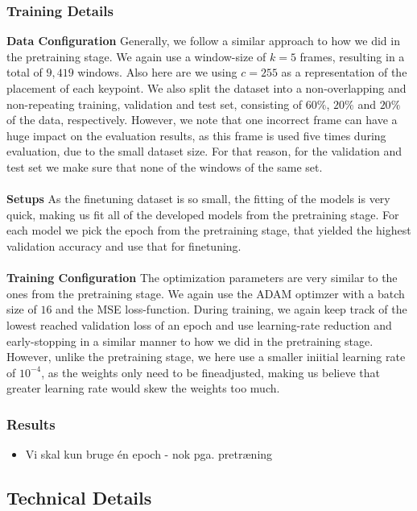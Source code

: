 \documentclass[./main.tex]{subfiles}
\begin{document}
\subsubsection{Training Details}
\textbf{Data Configuration} Generally, we follow a similar approach to how we did in the pretraining stage. We again use a window-size of $k = 5$ frames, resulting in a total of $9,419$ windows. Also here are we using $c = 255$ as a representation of the placement of each keypoint. We also split the dataset into a non-overlapping and non-repeating training, validation and test set, consisting of $60\%$, $20\%$ and $20\%$ of the data, respectively. However, we note that one incorrect frame can have a huge impact on the evaluation results, as this frame is used five times during evaluation, due to the small dataset size. For that reason, for the validation and test set we make sure that none of the windows of the same set.
\\
\\
\textbf{Setups} As the finetuning dataset is so small, the fitting of the models is very quick, making us fit all of the developed models from the pretraining stage. For each model we pick the epoch from the pretraining stage, that yielded the highest validation accuracy and use that for finetuning.
\\
\\
\textbf{Training Configuration} The optimization parameters are very similar to the ones from the pretraining stage. We again use the ADAM optimzer with a batch size of $16$ and the MSE loss-function. During training, we again keep track of the lowest reached validation loss of an epoch and use learning-rate reduction and early-stopping in a similar manner to how we did in the pretraining stage. However, unlike the pretraining stage, we here use a smaller iniitial learning rate of $10^{-4}$, as the weights only need to be fineadjusted, making us believe that greater learning rate would skew the weights too much.

\subsubsection{Results}
\begin{itemize}
    \item Vi skal kun bruge én epoch - nok pga. pretræning
\end{itemize}

\subsection*{Technical Details}

\label{sec:experiments}
\end{document}
